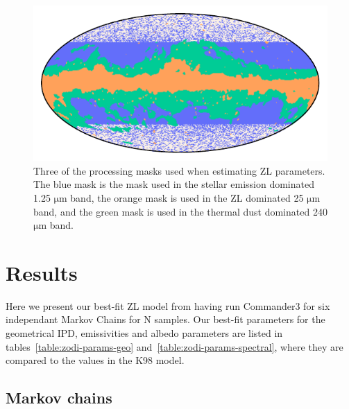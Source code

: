 \documentclass[twocolumn]{aa}
\begin{document}
\begin{figure}
    \centering
    \includegraphics[width=\columnwidth]{figs/zodi_proc_masks.pdf}
    \caption{Three of the processing masks used when estimating ZL parameters. The blue mask is the 
    mask used in the stellar emission dominated 1.25 $\mathrm{\mu m}$ band, the orange mask is used 
    in the ZL dominated 25 $\mathrm{\mu m}$ band, and the green mask is used in the thermal dust dominated 
    240 $\mathrm{\mu m}$ band.}
    \label{fig:zodi-procmask}
\end{figure}





\section{Results}\label{sect:improved-model}
Here we present our best-fit ZL model from having run Commander3 for six independant
Markov Chains for N samples. Our best-fit parameters for the geometrical IPD, emissivities 
and albedo parameters are listed in tables~\ref{table:zodi-params-geo} 
and~\ref{table:zodi-params-spectral}, where they are compared to the values in the K98 model.


\subsection{Markov chains}
\end{document}
